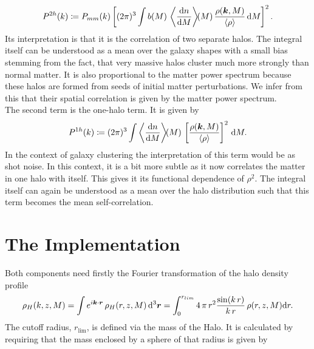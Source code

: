 \documentclass[../main.tex]{subfiles}
\begin{document}
\begin{equation}
P^{2h}(k) \coloneqq P_{mm}(k) \left[(2\pi)^3\int b(M)\,\left\langle\frac{\mathrm{d} n}{\mathrm{d} M}\right\rangle\!\!(M)\,\frac{\rho(\boldsymbol{k},M)}{\langle \rho \rangle} \, \mathrm{d} M\right]^2.
\end{equation}
Its interpretation is that it is the correlation of two separate halos. The integral itself can be understood as a mean over the galaxy shapes with a small bias stemming from the fact, that very massive halos cluster much more strongly than normal matter. It is also proportional to the matter power spectrum because these halos are formed from seeds of initial matter perturbations. We infer from this that their spatial correlation is given by the matter power spectrum.\\
The second term is the one-halo term. It is given by 
\begin{equation}
    P^{1h}(k) \coloneqq (2\pi)^3 \int \left\langle\frac{\mathrm{d} n}{\mathrm{d} M}\right\rangle\!\!(M)\,\left[\frac{\rho(\boldsymbol{k},M)}{\langle \rho \rangle}\right]^2 \,\mathrm{d} M.
\end{equation}
In the context of galaxy clustering the interpretation of this term would be as shot noise. In this context, it is a bit more subtle as it now correlates the matter in one halo with itself. This gives it its functional dependence of $\rho^2$. The integral itself can again be understood as a mean over the halo distribution such that this term becomes the mean self-correlation. 

\section{The \hmcode Implementation}
Both components need firstly the Fourier transformation of the halo density profile
\begin{equation}
    \rho_H(k,z,M) = \int e^{i\boldsymbol{k}\cdot \boldsymbol{r}}\,\rho_H(r,z,M)\,\mathrm{d}^3 \boldsymbol{r} = \int_0^{r_{lim}} 4\,\pi\,r^2 \frac{\sin(k\,r)}{k\,r}\,\rho(r,z,M) \mathrm{d} r.
\end{equation}
The cutoff radius, $r_\mathrm{lim}$, is defined via the mass of the Halo. It is calculated by requiring that the mass enclosed by a sphere of that radius is given by 
\end{document}
